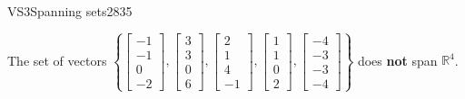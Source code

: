 \begin{exercise}{VS3}{Spanning sets}{2835}
\begin{exerciseAnswer}
 

 The set of vectors \(\left\{ \left[\begin{array}{c}
-1 \\
-1 \\
0 \\
-2
\end{array}\right] , \left[\begin{array}{c}
3 \\
3 \\
0 \\
6
\end{array}\right] , \left[\begin{array}{c}
2 \\
1 \\
4 \\
-1
\end{array}\right] , \left[\begin{array}{c}
1 \\
1 \\
0 \\
2
\end{array}\right] , \left[\begin{array}{c}
-4 \\
-3 \\
-3 \\
-4
\end{array}\right] \right\}\) does \textbf{not} span \(\mathbb{R}^4\). 

 \end{exerciseAnswer}
 \end{exercise}


